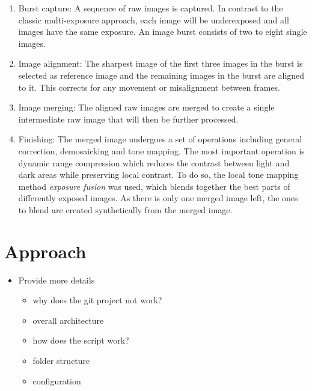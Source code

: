 \documentclass{egpubl}
\begin{document}
\begin{enumerate}
    \item Burst capture: A sequence of raw images is captured. In contrast to the classic 
          multi-exposure approach, each image will be underexposed and all images have the
          same exposure. An image burst consists of two to eight single images.
    \item Image alignment: The sharpest image of the first three images in the burst is 
          selected as reference image and the remaining images in the burst are aligned 
          to it. This corrects for any movement or misalignment between frames.
    \item Image merging: The aligned raw images are merged to create a single intermediate 
          raw image that will then be further processed.
    \item Finishing: The merged image undergoes a set of operations including general
          correction, demosaicking and tone mapping. The most important operation is
          dynamic range compression which reduces the contrast between light and dark
          areas while preserving local contrast. To do so, the local tone mapping method
          \textit{exposure fusion} was used, which blends together the best parts of
          differently exposed images. As there is only one merged image left, the ones 
          to blend are created synthetically from the merged image.
\end{enumerate}


\section{Approach}
\label{sec:approach}

\begin{itemize}
      \item Provide more details
      \begin{itemize}
            \item why does the git project not work?
            \item overall architecture
            \item how does the script work?
            \item folder structure
            \item configuration
      \end{itemize}
\end{itemize}
\end{document}
